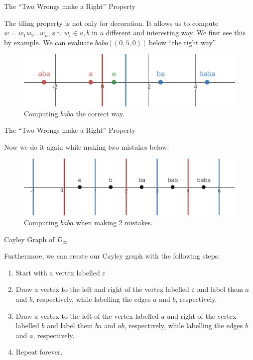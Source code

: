 \documentclass[usenames,dvipsnames]{beamer}
\begin{document}
\begin{frame}{The ``Two Wrongs make a Right'' Property}

The tiling property is not only for decoration. It allows us to compute $w=w_{1}w_{2}\ldots w_{n}$, s.t.
$w_{i}\in {a,b}$ in a different and interesting way. We first see this by example. We can evaluate
$baba[(0,5,0)]$ below ``the right way''.

\begin{figure}[h]
    \centering
    \includegraphics[width=1\textwidth]{images/2-03-Computing_baba.png}
    \caption{Computing $baba$ the correct way.}
\end{figure}

\end{frame}

\begin{frame}{The ``Two Wrongs make a Right'' Property}

Now we do it again while making two mistakes below:

\begin{figure}[h]
    \centering
    \includegraphics[width=1\textwidth]{images/2-04-Wrong_Way.png}
    \caption{Computing $baba$ when making 2 mistakes.}
\end{figure}

\end{frame}

\begin{frame}{Cayley Graph of $D_\infty$}

Furthermore, we can create our Cayley graph with the following steps:  

\begin{enumerate}
  \item Start with a vertex labelled $\varepsilon$
  \item Draw a vertex to the left and right of the vertex labelled $\varepsilon$ and label them $a$ and
  $b$, respectively, while labelling the edges $a$ and $b$, respectively.
  \item Draw a vertex to the left of the vertex labelled $a$ and right of the vertex labelled $b$ and label
  them $ba$ and $ab$, respectively, while labelling the edges $b$ and $a$, respectively.
  \item Repeat forever.
\end{enumerate}

\end{frame}
\end{document}
